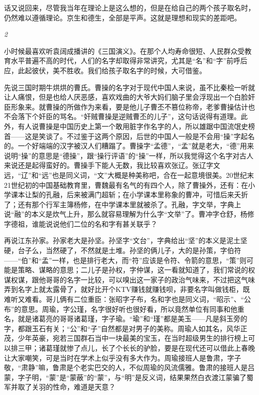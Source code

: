 \documentclass[twoside,openright,headings=optiontohead]{ctexbook} %
\begin{document}
{话又说回来，尽管我当年在理论上是这么想的，但是在给自己的两个孩子取名时，仍然难以遵循理论。京生和德生，全部是平声。这就是理想和现实的差距吧。

\emph{2}

小时候最喜欢听袁阔成播讲的《三国演义》。在那个人均寿命很短、人民群众受教育水平普遍不高的时代，人们的名字却取得非常讲究，尤其是``名''和``字''前呼后应，此起彼伏，美不胜收。我们给孩子取名字的时候，大可借鉴。

先说三国时期牛烘烘的曹氏。曹操的名字对于现代中国人来说，虽不比秦桧一听就让人痛恨，但是也给人厌恶感，喜欢戏曲的大爷大妈们脑子里会浮现出一个白脸奸臣形象来。就曹操的所做作为来看，要是他儿子曹丕不篡位称帝，老爹曹操估计也不会落下个奸臣的骂名。``奸贼曹操是逆贼曹丕的儿子''，这句话说得有道理。此外，有人说曹操是中国历史上第一个敢用脏字作名字的人，所以雄踞中国流氓史榜首------这是笑谈了。不过鉴于这两个原因，后世的中国人一般是不会用``操''字起名的。一个好端端的汉字被汉人们糟蹋了。曹操字``孟德''，``孟''就是老大，``德''用来说明``操''的意思是``德操''，跟``操行评语''的``操''一样，所以我觉得这个名字对古人来说还是起得蛮好的。曹操手下能人无数，我比较喜欢张辽。张辽字文远，``辽''和``远''也是同义词，``文''大概是种美称吧，合在一起意境很美。20世纪末21世纪初的中国基础教育里，曹魏最有名气的有四个人，除了曹操外，还有：在小学课本让梨的孔融，后来被满门超斩；在小学课本里称象的曹冲，可惜后来夭折了；还有那个行军主簿杨修，在中学课本里就被杀了。孔融，字文举，字典上说``融''的本义是炊气上升，那么就容易理解为什么字``文举''了。曹冲字仓舒，杨修字德祖，谁能说说他们二位的名和字有甚关联乎？

再说江东孙家。孙家老大是孙坚。孙坚字``文台''，字典给出``坚''的本义是泥土坚硬，台子么，当然硬了，不然就是土堆。孙坚的俩儿子，大的是孙策，字伯符------``伯''和``孟''一样，也是排行老大，而``符''应该是令符、令箭的意思，``策''则可能是策略、谋略的意思；二儿子是孙权，字仲谋，这一看就知道了，我们常说的权谋权谋，跟他哥哥的名字一比较，可以嗅出这一家子的政治气味来，不过把这气味弄到名字上就太露骨了，就好比开个KTV赚钱就赚钱呗，非要名字叫做钱柜，既难听又难看。哥儿俩有二位重臣：张昭字子布，名和字也是同义词，``昭示''、``公布''的意思。周瑜，字公瑾，名字很好听也很好看，所以竟然单位有同事和他重名，就是诸葛亮的哥哥诸葛瑾，字子瑜。``瑜''和``瑾''都是美玉------凡是斜玉旁的字，都跟玉石有关；``公''和``子''自然都是对男子的美称。周瑜人如其名，风华正茂，少年英豪，宛若三国群石当中一块最美的宝玉，在当时超级男生的排行榜上可以排三甲；诸葛瑾就惨了点儿，长了个长长的驴脸，要是在现代还可以借此上春晚让大家嘲笑，可是当时在学术上似乎没有多大作为。周瑜接班人是鲁肃，字子敬，``肃静''嘛，鲁肃是个老实巴交的人，不似周瑜的风流儒雅。鲁肃的接班人是吕蒙，字子明，``蒙''是``蒙蔽''的``蒙''，与``明''是反义词，结果果然白衣渡江蒙骗了蜀军并取了关羽的性命，难道是天意？

}
\end{document}
